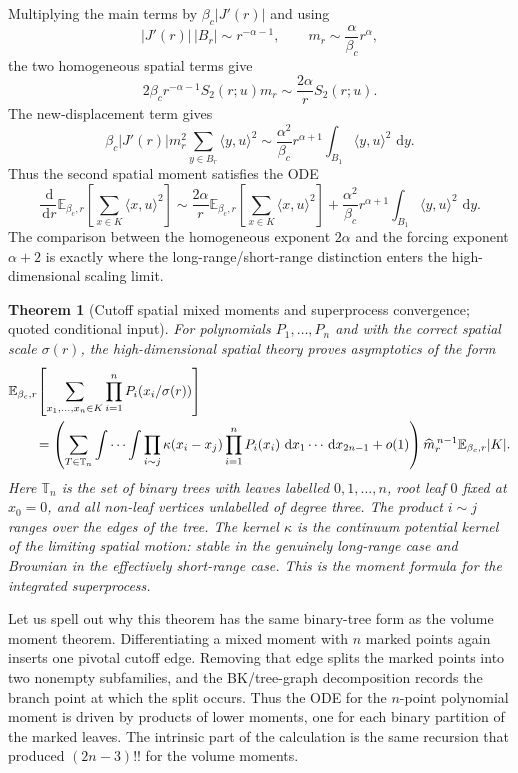\documentclass[11pt,reqno]{book}
\numberwithin{equation}{chapter}
\theoremstyle{plain}
\newtheorem{theorem}{Theorem}[chapter]
\theoremstyle{definition}
\theoremstyle{remark}
\newcommand{\E}{\mathbb E}
\newcommand{\1}{\mathbf 1}
\newcommand{\dd}{\,\mathrm d}
\begin{document}
Multiplying the main terms by \(\beta_c|J'(r)|\) and using
\[
  |J'(r)|\,|B_r|\sim r^{-\alpha-1},
  \qquad
  m_r\sim\frac{\alpha}{\beta_c}r^\alpha,
\]
the two homogeneous spatial terms give
\[
  2\beta_c r^{-\alpha-1}
  S_2(r;u)m_r
  \sim
  \frac{2\alpha}{r}S_2(r;u).
\]
The new-displacement term gives
\[
  \beta_c |J'(r)|m_r^2
  \sum_{y\in B_r}\langle y,u\rangle^2
  \sim
  \frac{\alpha^2}{\beta_c}
  r^{\alpha+1}
  \int_{B_1}\langle y,u\rangle^2\,\dd y.
\]
Thus the second spatial moment satisfies the ODE
\[
  \frac{\dd}{\dd r}
  \mathbb E_{\beta_c,r}\left[
    \sum_{x\in K}\langle x,u\rangle^2
  \right]
  \sim
  \frac{2\alpha}{r}
  \mathbb E_{\beta_c,r}\left[
    \sum_{x\in K}\langle x,u\rangle^2
  \right]
  +
  \frac{\alpha^2}{\beta_c}r^{\alpha+1}
  \int_{B_1}\langle y,u\rangle^2\,\dd y.
\]
The comparison between the homogeneous exponent $2\alpha$ and the forcing exponent $\alpha+2$ is exactly where the long-range/short-range distinction enters the high-dimensional scaling limit.

\begin{theorem}[Cutoff spatial mixed moments and superprocess convergence; quoted conditional input]
For polynomials \(P_1,\ldots,P_n\) and with the correct spatial scale
\(\sigma(r)\), the high-dimensional spatial theory proves asymptotics of the
form
\[
  \begin{aligned}
  &\E_{\beta_c,r}\!\left[
    \sum_{x_1,\ldots,x_n\in K}
    \prod_{i=1}^n P_i(x_i/\sigma(r))
  \right]
  \\
  &\qquad =
  \left(
    \sum_{T\in\mathbb T_n}
    \idotsint
    \prod_{i\sim j}\kappa(x_i-x_j)
    \prod_{i=1}^n P_i(x_i)\,
    \dd x_1\cdots \dd x_{2n-1}
    +o(1)
  \right)
  \widehat m_r^{\,n-1}\E_{\beta_c,r}|K|.
  \end{aligned}
\]
Here \(\mathbb T_n\) is the set of binary trees with leaves labelled
\(0,1,\ldots,n\), root leaf \(0\) fixed at \(x_0=0\), and all non-leaf
vertices unlabelled of degree three. The product \(i\sim j\) ranges over the
edges of the tree. The kernel \(\kappa\) is the continuum potential kernel of
the limiting spatial motion: stable in the genuinely long-range case and
Brownian in the effectively short-range case. This is the moment formula for
the integrated superprocess.
\end{theorem}

Let us spell out why this theorem has the same binary-tree form as the
volume moment theorem. Differentiating a mixed moment with \(n\) marked
points again inserts one pivotal cutoff edge. Removing that edge splits the
marked points into two nonempty subfamilies, and the BK/tree-graph
decomposition records the branch point at which the split occurs. Thus the
ODE for the \(n\)-point polynomial moment is driven by products of lower
moments, one for each binary partition of the marked leaves. The intrinsic
part of the calculation is the same recursion that produced
\((2n-3)!!\) for the volume moments.
\end{document}
